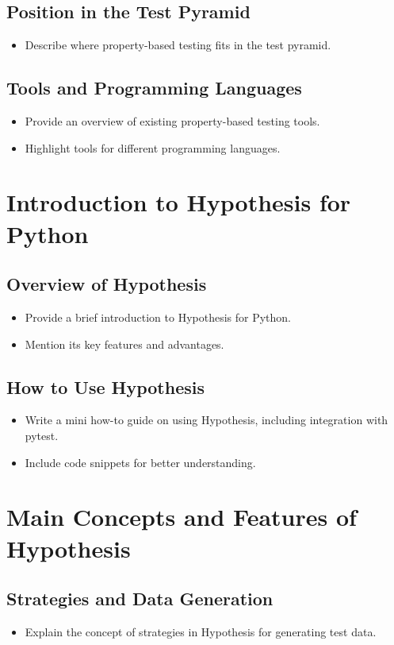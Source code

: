 \documentclass[runningheads]{llncs}
\begin{document}
\subsection{Position in the Test Pyramid}
\begin{itemize}
  \item Describe where property-based testing fits in the test pyramid.
\end{itemize}

\subsection{Tools and Programming Languages}
\begin{itemize}
  \item Provide an overview of existing property-based testing tools.
  \item Highlight tools for different programming languages.
\end{itemize}

\section{Introduction to Hypothesis for Python}
\subsection{Overview of Hypothesis}
\begin{itemize}
  \item Provide a brief introduction to Hypothesis for Python.
  \item Mention its key features and advantages.
\end{itemize}

\subsection{How to Use Hypothesis}
\begin{itemize}
  \item Write a mini how-to guide on using Hypothesis, including integration with pytest.
  \item Include code snippets for better understanding.
\end{itemize}

\section{Main Concepts and Features of Hypothesis}
\subsection{Strategies and Data Generation}
\begin{itemize}
  \item Explain the concept of strategies in Hypothesis for generating test data.
\end{itemize}
\end{document}
